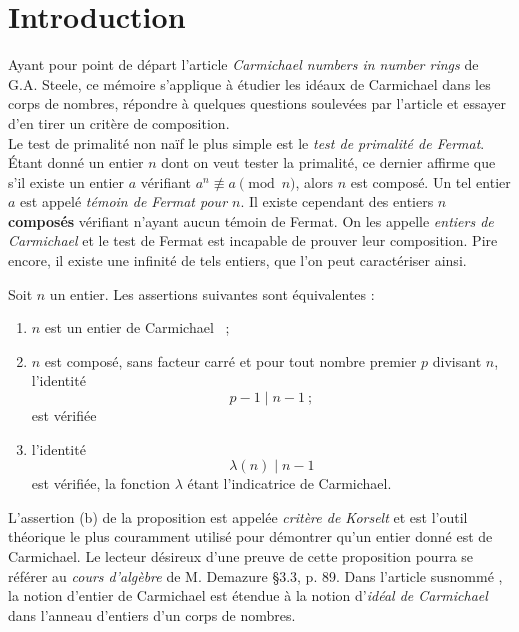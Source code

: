 \section*{Introduction}

Ayant pour point de départ l'article \textit{Carmichael numbers in number rings} \cite{article} de G.A. Steele, ce mémoire s'applique à étudier les idéaux de Carmichael dans les corps de nombres, répondre à quelques questions soulevées par l'article et essayer d'en tirer un critère de composition. \\

Le test de primalité non naïf le plus simple est le \emph{test de primalité de Fermat}. Étant donné un entier $n$ dont on veut tester la primalité, ce dernier affirme que s'il existe un entier $a$ vérifiant $a^n \not \equiv a \pmod{n}$, alors $n$ est composé. Un tel entier $a$ est appelé \emph{témoin de Fermat pour $n$}. Il existe cependant des entiers $n$ \textbf{composés} vérifiant n'ayant aucun témoin de Fermat. On les appelle \emph{entiers de Carmichael} et le test de Fermat est incapable de prouver leur composition. Pire encore, il existe une infinité de tels entiers, que l'on peut caractériser ainsi.

\begin{proposition}\label{korselt} Soit $n$ un entier. Les assertions suivantes sont équivalentes :
	\begin{enumerate}[font=\normalshape]
		\item $n$ est un entier de Carmichael ~;
		\item $n$ est composé, sans facteur carré et pour tout nombre premier $p$ divisant $n$, l'identité \[p-1 \mid n-1 ~;\] est vérifiée
		\item l'identité \[\lambda(n) \mid n-1\] est vérifiée, la fonction $\lambda$ étant l'indicatrice de Carmichael.
	\end{enumerate}
\end{proposition}

L'assertion (b) de la proposition est appelée \textit{critère de Korselt} et est l'outil théorique le plus couramment utilisé pour démontrer qu'un entier donné est de Carmichael. Le lecteur désireux d'une preuve de cette proposition pourra se référer au \textit{cours d'algèbre} de M. Demazure \cite{Demazure} §3.3, p. 89. Dans l'article susnommé \cite{article}, la notion d'entier de Carmichael est étendue à la notion d'\emph{idéal de Carmichael} dans l'anneau d'entiers d'un corps de nombres.


